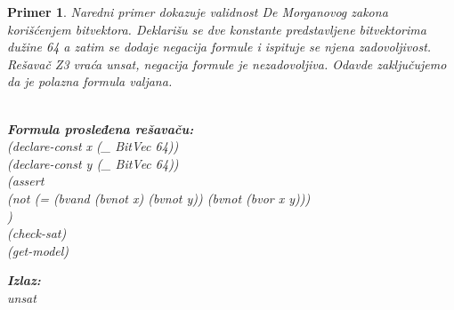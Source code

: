 \documentclass[12pt,oneside]{memoir}
\newcommand\tab[1][0.5cm]{\hspace*{#1}}
\newtheorem{primer}{Primer}
\begin{document}
\begin{primer} Naredni primer dokazuje validnost De Morganovog zakona korišćenjem bitvektora. Deklarišu se dve konstante predstavljene bitvektorima dužine 64 a zatim se dodaje negacija formule i ispituje se njena zadovoljivost. Rešavač Z3 vraća unsat, negacija formule je nezadovoljiva.
Odavde zaključujemo da je polazna formula valjana.
\\ \\
\hspace{9.5cm}
\begin{minipage}[t]{0.7\textwidth}
\textbf{Formula prosleđena rešavaču:}
\\(declare-const x (\_ BitVec 64))
\\(declare-const y (\_ BitVec 64))
\\(assert 
\\\tab(not (= (bvand (bvnot x) (bvnot y)) (bvnot (bvor x y)))
\\)
\\(check-sat)
\\(get-model)
\end{minipage}
\hspace{1cm}
\begin{minipage}[t]{0.4\textwidth}
\vspace{-0.25cm}
\textbf{Izlaz:}
\\unsat
\end{minipage}
\end{primer}
\end{document}
